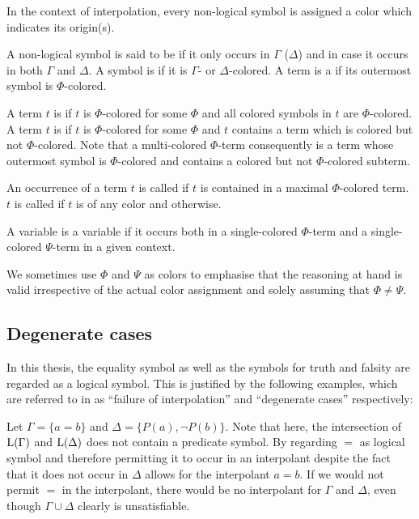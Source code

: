 In the context of interpolation, every non-logical symbol is assigned a color which indicates its origin(s). 
\begin{defi}[Coloring]
A non-logical symbol is said to be  if it only occurs in $\Gamma$ ($\Delta$) and  in case it occurs in both $\Gamma$ and $\Delta$. A symbol is  if it is $\Gamma$- or $\Delta$-colored.
A term is a  if its outermost symbol is $\Phi$-colored.

A term $t$ is  if $t$ is $\Phi$-colored for some $\Phi$ and all colored symbols in $t$ are $\Phi$-colored.
A term $t$ is  if $t$ is $\Phi$-colored for some $\Phi$ and $t$ contains a term which is colored but not $\Phi$-colored.
Note that a multi-colored $\Phi$-term consequently is a term whose outermost symbol is $\Phi$-colored and contains a colored but not $\Phi$-colored subterm.

  An occurrence of a term $t$ is called  if $t$ is contained in a maximal $\Phi$-colored term.
	$t$ is called  if $t$ is of any color and  otherwise.

	A variable is a  variable if it occurs both in a single-colored $\Phi$-term and a single-colored $\Psi$-term in a given context.
\end{defi}

We sometimes use $\Phi$ and $\Psi$ as colors to emphasise that the reasoning at hand is valid irrespective of the actual color assignment and solely assuming that $\Phi \neq \Psi$. 


\subsection{Degenerate cases}
In this thesis, the equality symbol as well as the symbols for truth and falsity are regarded as a logical symbol. 
This is justified by the following examples, which are referred to in \cite[Example 20.2 and 20.4]{boolos2007computability} as ``failure of interpolation'' and ``degenerate cases'' respectively:

\begin{exa}
	Let $\Gamma = \{ a=b \} $ and $\Delta = \{P(a), \lnot P(b)\}$.
	Note that here, the intersection of $\operatorname{L}(\Gamma)$ and $\operatorname{L}(\Delta)$ does not contain a predicate symbol.
	By regarding $=$ as logical symbol and therefore permitting it to occur in an interpolant despite the fact that it does not occur in $\Delta$ allows for the interpolant $a=b$.
	If we would not permit $=$ in the interpolant, there would be no interpolant for $\Gamma$ and $\Delta$, even though $\Gamma \cup \Delta$ clearly is unsatisfiable.
\end{exa}

